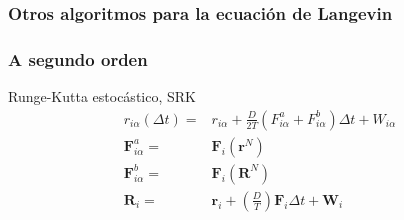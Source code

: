 \begin{bibunit}[aalpha]
  \begin{frame}\frametitle{Otros algoritmos para la ecuaci\'on de Langevin}
    \frametitle{A segundo orden}
    \begin{alertblock}{Runge-Kutta estocástico, SRK \cite{BrankaHeyes:1999}}
      \begin{align*}
        r_{i\alpha}(\Delta t)=&r_{i\alpha}+\frac{D}{2T}(F_{i\alpha}^a+F_{i\alpha}^b)\Delta t+W_{i\alpha}\\
        \mathbf{F}_{i\alpha}^{a}=&\mathbf{F}_i(\mathbf{r}^N)\\
        \mathbf{F}_{i\alpha}^{b}=&\mathbf{F}_i(\mathbf{R}^N)\\
        \mathbf{R}_i=&\mathbf{r}_i+\left(\frac{D}{T}\right)\mathbf{F}_i\Delta t+\mathbf{W}_i
      \end{align*}
    \end{alertblock}
  \end{frame}
\end{bibunit}